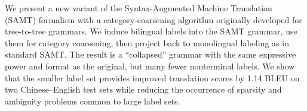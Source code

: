 We present a new variant of the Syntax-Augmented Machine Translation (SAMT) formalism with a category-coarsening algorithm originally developed for
 tree-to-tree grammars.                          We induce bilingual labels into the
 SAMT
 grammar,
 use
 them for category coarsening, then project back to monolingual labeling as in
 standard SAMT.                          The result is a ``collapsed'' grammar with the
 same
 expressive
 power and format as the original, but many fewer nonterminal labels.  We show
 that the smaller label set provides improved translation scores by 1.14 BLEU on
 two Chinese--English test sets while reducing the occurrence of sparsity and
 ambiguity problems common to large label sets.


